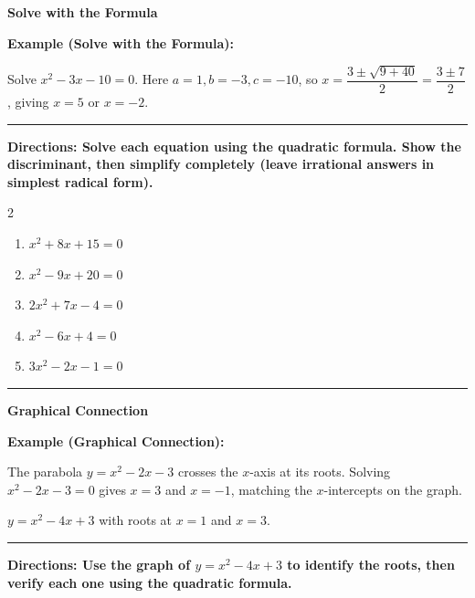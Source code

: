 \documentclass[12pt]{article}
\begin{document}
\begin{center}{\Large \textbf{Solve with the Formula}}\end{center}\vspace{0.2cm}
\textbf{Example (Solve with the Formula):}

Solve $x^2-3x-10=0$. Here $a=1,b=-3,c=-10$, so $x=\dfrac{3\pm\sqrt{9+40}}{2}=\dfrac{3\pm 7}{2}$, giving $x=5$ or $x=-2$.

\vspace{0.2cm}\hrule\vspace{0.35cm}
\textbf{Directions: Solve each equation using the quadratic formula. Show the discriminant, then simplify completely (leave irrational answers in simplest radical form).}

\begin{multicols}{2}
\begin{enumerate}[label=\textbf{\arabic*.}, start=5, itemsep=3cm]
  \item $\displaystyle x^2+8x+15=0$
  \item $\displaystyle x^2-9x+20=0$
  \item $\displaystyle 2x^2+7x-4=0$
  \item $\displaystyle x^2-6x+4=0$
  \item $\displaystyle 3x^2-2x-1=0$
\end{enumerate}
\end{multicols}
\vspace{0.25cm}\hrule\vspace{0.35cm}

\begin{center}{\Large \textbf{Graphical Connection}}\end{center}\vspace{0.2cm}
\textbf{Example (Graphical Connection):}

The parabola $y=x^2-2x-3$ crosses the $x$-axis at its roots. Solving $x^2-2x-3=0$ gives $x=3$ and $x=-1$, matching the $x$-intercepts on the graph.

\begin{center}\end{center}
{\small\centering $y=x^2-4x+3$ with roots at $x=1$ and $x=3$.\par}
\vspace{0.2cm}\hrule\vspace{0.35cm}
\textbf{Directions: Use the graph of $y=x^2-4x+3$ to identify the roots, then verify each one using the quadratic formula.}
\end{document}
